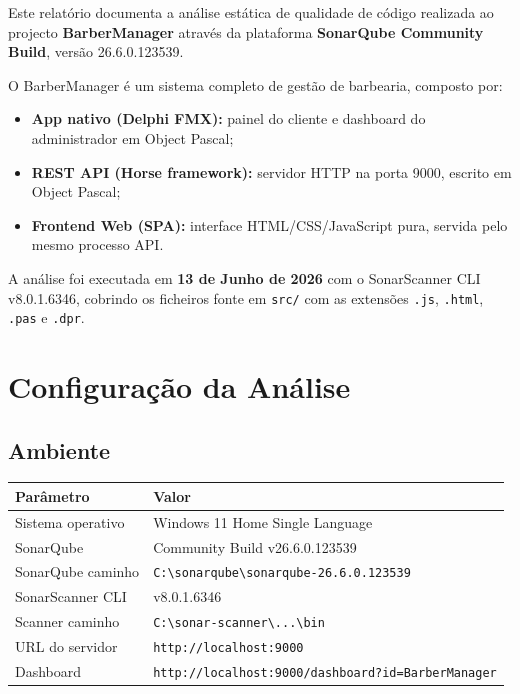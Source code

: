 \documentclass[12pt,a4paper]{article}
\begin{document}
Este relatório documenta a análise estática de qualidade de código realizada ao projecto \textbf{BarberManager} através da plataforma \textbf{SonarQube Community Build}, versão 26.6.0.123539.

O BarberManager é um sistema completo de gestão de barbearia, composto por:
\begin{itemize}
    \item \textbf{App nativo (Delphi FMX):} painel do cliente e dashboard do administrador em Object Pascal;
    \item \textbf{REST API (Horse framework):} servidor HTTP na porta 9000, escrito em Object Pascal;
    \item \textbf{Frontend Web (SPA):} interface HTML/CSS/JavaScript pura, servida pelo mesmo processo API.
\end{itemize}

A análise foi executada em \textbf{13 de Junho de 2026} com o SonarScanner CLI v8.0.1.6346, cobrindo os ficheiros fonte em \texttt{src/} com as extensões \texttt{.js}, \texttt{.html}, \texttt{.pas} e \texttt{.dpr}.

\section{Configuração da Análise}

\subsection{Ambiente}

\begin{tabular}{ll}
    \toprule
    \textbf{Parâmetro}       & \textbf{Valor} \\
    \midrule
    Sistema operativo        & Windows 11 Home Single Language \\
    SonarQube                & Community Build v26.6.0.123539 \\
    SonarQube caminho        & \texttt{C:\textbackslash sonarqube\textbackslash sonarqube-26.6.0.123539} \\
    SonarScanner CLI         & v8.0.1.6346 \\
    Scanner caminho          & \texttt{C:\textbackslash sonar-scanner\textbackslash ...\textbackslash bin} \\
    URL do servidor          & \texttt{http://localhost:9000} \\
    Dashboard                & \texttt{http://localhost:9000/dashboard?id=BarberManager} \\
    \bottomrule
\end{tabular}
\end{document}

